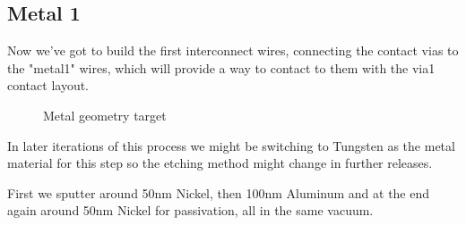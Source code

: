 \subsection{Metal 1}\label{chapter_metal1}

Now we've got to build the first interconnect wires, connecting the contact vias to the "metal1" wires, which will provide a way to contact to them with the via1 contact layout.

\begin{figure}[H]
	\centering
	\begin{tikzpicture}[node distance = 3cm, auto, thick,scale=\CrossAndTopSectionBig, every node/.style={transform shape}]
		
	\end{tikzpicture}
	\caption{Metal geometry target}
	\label{metal1_target}
\end{figure}

In later iterations of this process we might be switching to Tungsten as the metal material for this step so the etching method might change in further releases.

First we sputter around 50nm Nickel, then 100nm Aluminum and at the end again around 50nm Nickel for passivation, all in the same vacuum.
